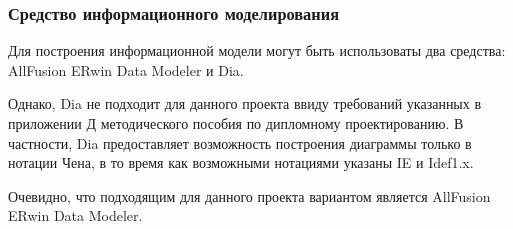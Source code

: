 \subsubsection{Средство информационного моделирования}

Для построения информационной модели могут быть использоваты два средства: AllFusion ERwin Data Modeler и Dia.

Однако, Dia не подходит для данного проекта ввиду требований указанных в приложении Д методического пособия по дипломному проектированию. В частности, Dia предоставляет возможность построения диаграммы только в нотации Чена, в то время как возможными нотациями указаны IE и Idef1.x.

Очевидно, что подходящим для данного проекта вариантом является AllFusion ERwin Data Modeler.
